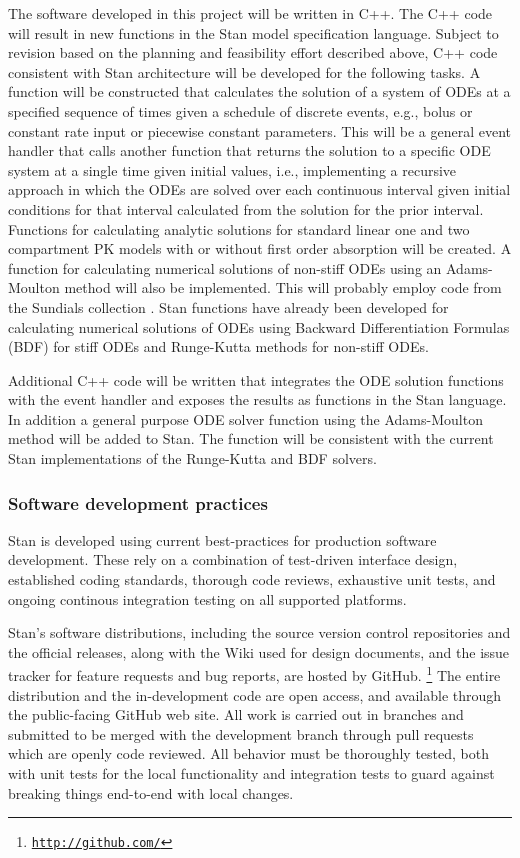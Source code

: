 \documentclass[11pt]{article}
\newcommand{\myurl}[1]{\href{#1}{{\tt #1}}}%
\begin{document}
The software developed in this project will be written in C++. The C++
code will result in new functions in the Stan model specification
language. Subject to revision based on the planning and feasibility
effort described above, C++ code consistent with Stan architecture
will be developed for the following tasks. A function will be
constructed that calculates the solution of a system of ODEs at a
specified sequence of times given a schedule of discrete events, e.g.,
bolus or constant rate input or piecewise constant parameters. This
will be a general event handler that calls another function that
returns the solution to a specific ODE system at a single time given
initial values, i.e., implementing a recursive approach in which the
ODEs are solved over each continuous interval given initial conditions
for that interval calculated from the solution for the prior
interval. Functions for calculating analytic solutions for standard
linear one and two compartment PK models with or without first order
absorption will be created.  A function for calculating numerical
solutions of non-stiff ODEs using an Adams-Moulton method will also be
implemented. This will probably employ code from the Sundials
collection \citep{hindmarsh-et-al:2005}. Stan functions have already
been developed for calculating numerical solutions of ODEs using
Backward Differentiation Formulas (BDF) for stiff ODEs and Runge-Kutta
methods for non-stiff ODEs.

Additional C++ code will be written that integrates the ODE solution
functions with the event handler and exposes the results as functions
in the Stan language. In addition a general purpose ODE solver
function using the Adams-Moulton method will be added to Stan. The function
will be consistent with the current Stan implementations of the
Runge-Kutta and BDF solvers.

\subsubsection{Software development practices}

Stan is developed using current best-practices for production software
development.  These rely on a combination of test-driven interface
design, established coding standards, thorough code reviews,
exhaustive unit tests, and ongoing continous integration testing
on all supported platforms.

Stan's software distributions, including the source version control
repositories and the official releases, along with the Wiki used for
design documents, and the issue tracker for feature requests and bug
reports, are hosted by GitHub.%
%
\footnote{\myurl{http://github.com/}}
%
The entire distribution and the in-development code are open access,
and available through the public-facing GitHub web site.  All work is
carried out in branches and submitted to be merged with the
development branch through pull requests which are openly code
reviewed.  All behavior must be thoroughly tested, both with unit
tests for the local functionality and integration tests to guard
against breaking things end-to-end with local changes.
\end{document}

